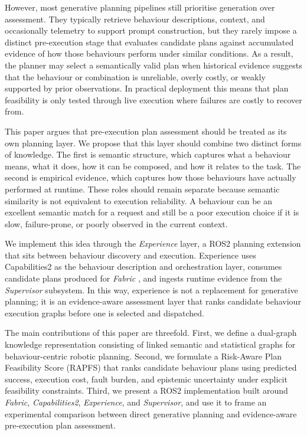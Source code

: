 \documentclass[letterpaper, 10pt, conference]{ieeeconf}
\begin{document}
However, most generative planning pipelines still prioritise generation over assessment. They typically retrieve behaviour descriptions, context, and occasionally telemetry to support prompt construction, but they rarely impose a distinct pre-execution stage that evaluates candidate plans against accumulated evidence of how those behaviours perform under similar conditions. As a result, the planner may select a semantically valid plan when historical evidence suggests that the behaviour or combination is unreliable, overly costly, or weakly supported by prior observations. In practical deployment this means that plan feasibility is only tested through live execution where failures are costly to recover from.

This paper argues that pre-execution plan assessment should be treated as its own planning layer. We propose that this layer should combine two distinct forms of knowledge. The first is semantic structure, which captures what a behaviour means, what it does, how it can be composed, and how it relates to the task. The second is empirical evidence, which captures how those behaviours have actually performed at runtime. These roles should remain separate because semantic similarity is not equivalent to execution reliability. A behaviour can be an excellent semantic match for a request and still be a poor execution choice if it is slow, failure-prone, or poorly observed in the current context.

We implement this idea through the \textit{Experience} layer, a ROS2 planning extension that sits between behaviour discovery and execution. Experience uses Capabilities2 \cite{pritchard_capabilities2_2025, woodall_ros_2014} as the behaviour description and orchestration layer, consumes candidate plans produced for \textit{Fabric} \cite{ratnayake2026generativepartiallyspecifiedfinite}, and ingests runtime evidence from the \textit{Supervisor} subsystem. In this way, experience is not a replacement for generative planning; it is an evidence-aware assessment layer that ranks candidate behaviour execution graphs before one is selected and dispatched.

The main contributions of this paper are threefold. First, we define a dual-graph knowledge representation consisting of linked semantic and statistical graphs for behaviour-centric robotic planning. Second, we formulate a Risk-Aware Plan Feasibility Score (RAPFS) that ranks candidate behaviour plans using predicted success, execution cost, fault burden, and epistemic uncertainty under explicit feasibility constraints. Third, we present a ROS2 implementation built around \textit{Fabric}, \textit{Capabilities2}, \textit{Experience}, and \textit{Supervisor}, and use it to frame an experimental comparison between direct generative planning and evidence-aware pre-execution plan assessment.
\end{document}
